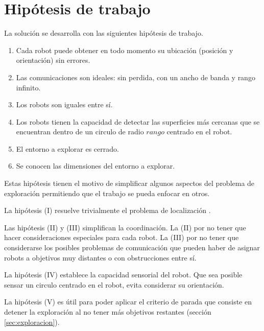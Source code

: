 
\section{Hipótesis de trabajo}\label{sec:hip}
La solución se desarrolla con las siguientes hipótesis de trabajo.
\begin{enumerate}[label=(\roman*)]
  \item Cada robot puede obtener en todo momento su ubicación (posición y
    orientación) sin errores.
  \item Las comunicaciones son ideales: sin perdida, con un ancho de banda y rango infinito.
  \item Los robots son iguales entre sí.
  \item Los robots tienen la capacidad de detectar las superficies más cercanas
    que se encuentran dentro de un circulo de radio $rango$ centrado en el
    robot.
  \item El entorno a explorar es cerrado.
  \item Se conocen las dimensiones del entorno a explorar.
\end{enumerate}

Estas hipótesis tienen el motivo de simplificar algunos aspectos del
problema de exploración permitiendo que el trabajo se pueda enfocar en otros.

La hipótesis (I) resuelve trivialmente el problema de localización \cite{slam}. 

Las hipótesis (II) y (III) simplifican la coordinación. La (II) por no tener
que hacer consideraciones especiales para cada robot. La (III) por no tener que
considerarse los posibles problemas de comunicación que pueden haber de asignar
robots a objetivos muy distantes o con obstrucciones entre sí. 

La hipótesis (IV) establece la capacidad sensorial del robot. Que sea posible 
sensar un circulo centrado en el robot, evita considerar su orientación.

La hipótesis (V) es útil para poder aplicar el criterio de parada que consiste
en detener la exploración al no tener más objetivos restantes (sección
\ref{sec:exploracion}). 

